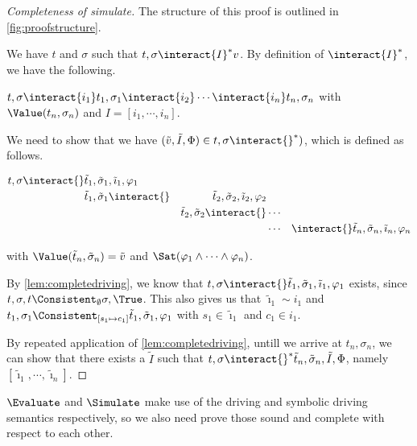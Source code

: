 \begin{proof}[Completeness of simulate]
  The structure of this proof is outlined in \cref{fig:proofstructure}.

  We have $t$ and $\sigma$ such that $t,\sigma\interact{I}^*v$.
  By definition of $\interact{I}^*$, we have the following.

  $t,\sigma\interact{i_1}t_1,\sigma_1\interact{i_2}\cdots \interact{i_n}t_n,\sigma_n$ with $\Value(t_n,\sigma_n)$ and $I=[i_1,\cdots,i_n]$.

  We need to show that we have $(\tilde{v},\tilde{I},\Phi)\in t,\sigma\interact{}^*)$,
  which is defined as follows.

  \begin{align*}
      t,\sigma\interact{}&\tilde{t}_1,\tilde{\sigma}_1,\tilde{\imath}_1,\phi_1&\\
                      &\tilde{t}_1,\tilde{\sigma}_1\interact{}&\tilde{t}_2,\tilde{\sigma}_2,\tilde{\imath}_2,\phi_2\\
                      &                                    &\tilde{t}_2,\tilde{\sigma}_2\interact{}&\cdots&\\
                      &                                    &                                    &\cdots&
                      \interact{}\tilde{t}_n,\tilde{\sigma}_n,\tilde{\imath}_n,\phi_n
  \end{align*}

  with $\Value(\tilde{t}_n,\tilde{\sigma}_n)=\tilde{v}$ and $\Sat(\phi_1\land\cdots\land\phi_n)$.

  By \cref{lem:completedriving}, we know that $t,\sigma\interact{}\tilde{t}_1,\tilde{\sigma}_1,\tilde{\imath}_1,\phi_1$ exists,
  since $t,\sigma,t\Consistent_{\emptyset}\sigma,\True$.
  This also gives us that $\tilde{\imath}_1\sim i_1$ and $t_1,\sigma_1\Consistent_{[s_1\mapsto c_1]}\tilde{t}_1,\tilde{\sigma}_1,\phi_1$ with $s_1\in\tilde{\imath}_1$ and $c_1\in i_1$.

  By repeated application of \cref{lem:completedriving}, untill we arrive at $t_n,\sigma_n$,
  we can show that there exists a $\tilde{I}$ such that $t,\sigma\interact{}^*\tilde{t}_n,\tilde{\sigma}_n,\tilde{I},\Phi$,
  namely $[\tilde{\imath}_1,\cdots,\tilde{\imath}_n]$.

\end{proof}

$\Evaluate$ and $\Simulate$ make use of the driving and symbolic driving semantics respectively, so we also need prove those sound and complete with respect to each other.



